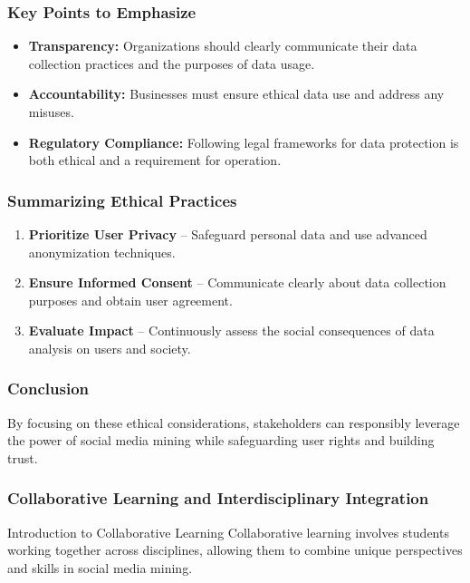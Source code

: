 \documentclass{beamer}
\begin{document}
\begin{frame}[fragile]
    \frametitle{Key Points to Emphasize}
    \begin{itemize}
        \item \textbf{Transparency:} Organizations should clearly communicate their data collection practices and the purposes of data usage.
        \item \textbf{Accountability:} Businesses must ensure ethical data use and address any misuses.
        \item \textbf{Regulatory Compliance:} Following legal frameworks for data protection is both ethical and a requirement for operation.
    \end{itemize}
\end{frame}

\begin{frame}[fragile]
    \frametitle{Summarizing Ethical Practices}
    \begin{enumerate}
        \item \textbf{Prioritize User Privacy} – Safeguard personal data and use advanced anonymization techniques.
        \item \textbf{Ensure Informed Consent} – Communicate clearly about data collection purposes and obtain user agreement.
        \item \textbf{Evaluate Impact} – Continuously assess the social consequences of data analysis on users and society.
    \end{enumerate}
\end{frame}

\begin{frame}[fragile]
    \frametitle{Conclusion}
    By focusing on these ethical considerations, stakeholders can responsibly leverage the power of social media mining while safeguarding user rights and building trust.
\end{frame}

\begin{frame}[fragile]
    \frametitle{Collaborative Learning and Interdisciplinary Integration}
    
    \begin{block}{Introduction to Collaborative Learning}
        Collaborative learning involves students working together across disciplines, allowing them to combine unique perspectives and skills in social media mining.
    \end{block}
\end{frame}
\end{document}
